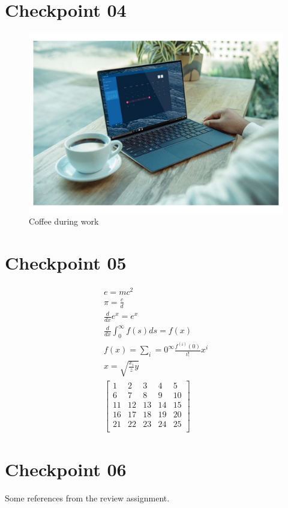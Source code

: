 \documentclass[a4paper,12pt]{article}
\begin{document}
\section{Checkpoint 04}
\begin{figure}[h]
    \centering
    \includegraphics[width=1\textwidth]{myimage}
    \caption{Coffee during work}
    \label{fig:my_label}
\end{figure}
\newpage

\section{Checkpoint 05}
\begin{eqnarray}
    e = mc^2 \\
    \pi = \frac{c}{d} \\
    \frac{d}{dx}e^x = e^x \\
    \frac{d}{dx}\int_0^\infty f(s)ds = f(x) \\
    f(x) = \sum_i = 0^\infty\frac{f^{(i)}(0)}{i!}x^i \\
    x = \sqrt{\frac{x_i}{z}y} \\
     \left[
    \begin{matrix}
      1 & 2 & 3 & 4 & 5 \\
      6 & 7 & 8 & 9 & 10 \\
      11 & 12 & 13 & 14 & 15 \\
      16 & 17 & 18 & 19 & 20 \\
      21 & 22 & 23 & 24 & 25 \\
    \end{matrix}
    \right]
\end{eqnarray}

\newpage
\section{Checkpoint 06}
Some references from the review assignment.
\cite{ahmed2014protibadi}
\cite{ahmed2015learning}
\cite{bardzelland}
\cite{bardzell2010feminist}
\cite{brewerbowei}
\cite{burrell2010evaluating}
\cite{butler2011bodies}
\cite{chen2015computing}
\cite{chess2015conspiracy}
\cite{clark2005women}
\cite{corbin1990grounded}
\cite{dimond2013hollaback}
\cite{halder2011cyber}
\cite{haraway2006cyborg}
\cite{houston2016values}

 
\end{document}
